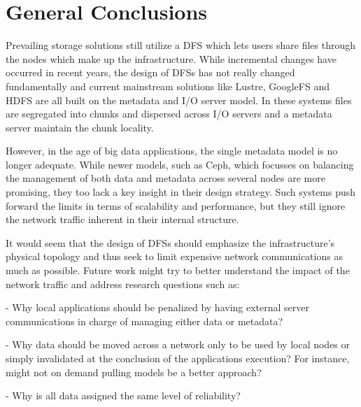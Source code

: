 \documentclass[11pt]{article}
\begin{document}

\section{General Conclusions}
Prevailing storage solutions still utilize a DFS which lets users share 
files through the nodes which make up the infrastructure. While incremental 
changes have occurred in recent years, the design of DFSs has not really 
changed fundamentally and current mainstream solutions like Lustre, GoogleFS  
and HDFS are all built on the metadata and I/O server model.  In these 
systems files are segregated into chunks and dispersed across I/O servers and 
a metadata server maintain the chunk locality. 

However, in the age of big data applications, the single metadata model is no 
longer adequate. While newer models, such as Ceph, which focusses on balancing 
the management of both data and metadata across several nodes are more promising, 
they too lack a key insight in their design strategy. Such systems push forward 
the limits in terms of scalability and performance, but they still ignore the 
network traffic inherent in their internal structure.

It would seem that the design of DFSs should emphasize the infrastructure’s 
physical topology and thus seek to limit expensive network communications as 
much as possible. Future work might try to better understand the impact of the 
network traffic and address research questions such as:

- Why local applications should be penalized by having external server 
communications in charge of managing either data or metadata?

- Why data should be moved across a network only to be used by local nodes or 
simply invalidated at the conclusion of the applications execution?  For instance, 
might not on demand pulling models be a better approach?

- Why is all data assigned the same level of reliability?
\end{document}
